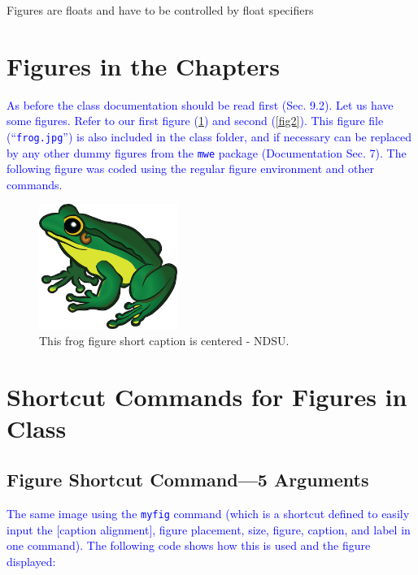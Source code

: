 \documentclass[phd]{ndsu-thesis-2022}
\newcommand\italk[1]{\textcolor{blue}{#1}}  %
\begin{document}
\kant[9-10]

{Figures are floats and have to be controlled by float specifiers}

\section{Figures in the Chapters}
\italk{As before the class documentation should be read first (Sec. 9.2). Let us have some figures. Refer to our first figure (\cref{fig1}) and second (\cref{fig2}). This figure file (``\texttt{frog.jpg}'') is also included in the class folder, and if necessary can be replaced by any other dummy figures from the \texttt{mwe} package (Documentation Sec. 7). The following figure was coded using the regular figure environment and other commands.}

\begin{figure}[H]
\captionsetup{singlelinecheck=true} 
\centering
\includegraphics[width=0.4\textwidth]{frog.jpg}
\caption{\label{fig:frog}This frog figure short caption is centered - NDSU.}
\label{fig1}
\end{figure}

\section{Shortcut Commands for Figures in Class}

\subsection{Figure Shortcut Command---5 Arguments}
\italk{The same image using the \texttt{myfig} command (which is a shortcut defined to easily input the [caption alignment], figure placement, size, figure, caption, and label in one command). The following code shows how this is used and the figure displayed:}
\end{document}
